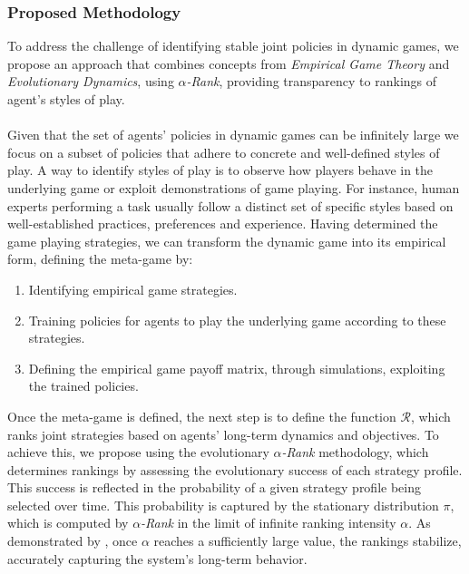 \begin{flushleft}
\begin{flushleft}
    \end{flushleft}

    \subsubsection{Proposed Methodology}

    \begin{flushleft}

        To address the challenge of identifying stable joint policies in dynamic games, we propose an approach that combines concepts from \emph{Empirical Game Theory} and \emph{Evolutionary Dynamics}, using \emph{$\alpha$-Rank}, providing transparency to rankings of agent's styles of play.\\~\\

        Given that the set of agents' policies in dynamic games can be infinitely large we focus on a subset of policies that adhere to concrete and well-defined styles of play. A way to identify styles of play is to observe how players behave in the underlying game or exploit demonstrations of game playing. For instance, human experts performing a task usually follow a distinct set of specific styles based on well-established practices, preferences and experience. Having determined the game playing strategies, we can transform the dynamic game into its empirical form, defining the meta-game by:
        \begin{enumerate}[label=(\alph*)]
            \item Identifying empirical game strategies.
            \item Training policies for agents to play the underlying game according to these strategies.
            \item Defining the empirical game payoff matrix, through simulations, exploiting the trained policies.
        \end{enumerate}

        Once the meta-game is defined, the next step is to define the function $\mathcal{R}$, which ranks joint strategies based on agents' long-term dynamics and objectives. To achieve this, we propose using the evolutionary \emph{$\alpha$-Rank} methodology, which determines rankings by assessing the evolutionary success of each strategy profile. This success is reflected in the probability of a given strategy profile being selected over time. This probability is captured by the stationary distribution $\pi$, which is computed by \emph{$\alpha$-Rank} in the limit of infinite ranking intensity $\alpha$. As demonstrated by \cite{omidshafiei2019alpharank}, once $\alpha$ reaches a sufficiently large value, the rankings stabilize, accurately capturing the system's long-term behavior.\\~\\


\end{flushleft}
\end{flushleft}
